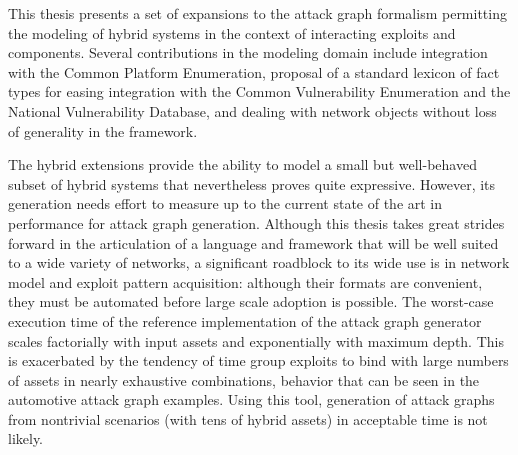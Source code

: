 This thesis presents a set of expansions to the attack graph formalism
permitting the modeling of hybrid systems in the context of interacting
exploits and components. Several contributions in the modeling domain include
integration with the Common Platform Enumeration, proposal of a standard
lexicon of fact types for easing integration with the Common Vulnerability
Enumeration and the National Vulnerability Database, and dealing with
network objects without loss of generality in the framework.

The hybrid extensions provide the ability to model a small but well-behaved
subset of hybrid systems that nevertheless proves quite expressive. However,
its generation needs effort to measure up to the current state of the art in
performance for attack graph generation.
Although this thesis takes great strides forward in the articulation of a
language and framework that will be well suited to a wide variety of networks,
a significant roadblock to its wide use is in network model and exploit pattern
acquisition: although their formats are convenient, they must be automated
before large scale adoption is possible.
The worst-case execution time of the reference implementation of the attack 
graph generator scales factorially with input assets and exponentially with
maximum depth. This is exacerbated by the tendency of time group exploits to
bind with large numbers of assets in nearly exhaustive combinations, behavior
that can be seen in the automotive attack graph examples. Using this tool,
generation of attack graphs from nontrivial scenarios (with tens
of hybrid assets) in acceptable time is not likely.

